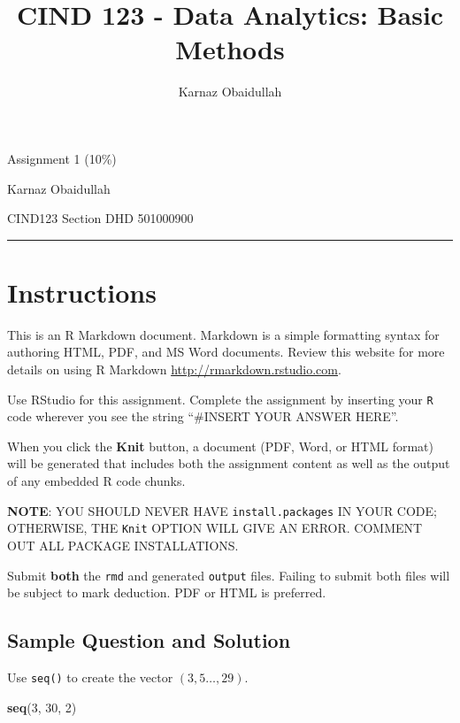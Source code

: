 \documentclass[
]{article}
\title{CIND 123 - Data Analytics: Basic Methods}
\author{Karnaz Obaidullah}
\date{}
\newenvironment{Shaded}{\begin{snugshade}}{\end{snugshade}}
\newcommand{\DecValTok}[1]{\textcolor[rgb]{0.00,0.00,0.81}{#1}}
\newcommand{\FunctionTok}[1]{\textcolor[rgb]{0.13,0.29,0.53}{\textbf{#1}}}
\newcommand{\NormalTok}[1]{#1}
\begin{document}
\maketitle

Assignment 1 (10\%)

Karnaz Obaidullah

CIND123 Section DHD 501000900

\begin{center}\rule{0.5\linewidth}{0.5pt}\end{center}

\hypertarget{instructions}{%
\section{Instructions}\label{instructions}}

This is an R Markdown document. Markdown is a simple formatting syntax
for authoring HTML, PDF, and MS Word documents. Review this website for
more details on using R Markdown \url{http://rmarkdown.rstudio.com}.

Use RStudio for this assignment. Complete the assignment by inserting
your \texttt{R} code wherever you see the string ``\#INSERT YOUR ANSWER
HERE''.

When you click the \textbf{Knit} button, a document (PDF, Word, or HTML
format) will be generated that includes both the assignment content as
well as the output of any embedded R code chunks.

\textbf{NOTE}: YOU SHOULD NEVER HAVE \texttt{install.packages} IN YOUR
CODE; OTHERWISE, THE \texttt{Knit} OPTION WILL GIVE AN ERROR. COMMENT
OUT ALL PACKAGE INSTALLATIONS.

Submit \textbf{both} the \texttt{rmd} and generated \texttt{output}
files. Failing to submit both files will be subject to mark deduction.
PDF or HTML is preferred.

\hypertarget{sample-question-and-solution}{%
\subsection{Sample Question and
Solution}\label{sample-question-and-solution}}

Use \texttt{seq()} to create the vector \((3,5\ldots,29)\).

\begin{Shaded}
\begin{Highlighting}[]
\FunctionTok{seq}\NormalTok{(}\DecValTok{3}\NormalTok{, }\DecValTok{30}\NormalTok{, }\DecValTok{2}\NormalTok{)}
\end{Highlighting}
\end{Shaded}
\end{document}
